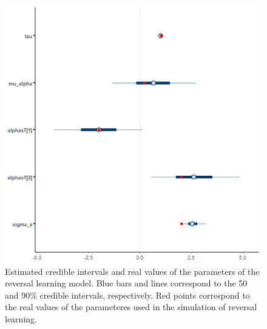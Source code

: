 \documentclass[
]{article}
\begin{document}
\begin{figure}

\includegraphics{reversal_mcmc_interv} \hfill{}

\caption{Estimated credible intervals and real values of the parameters of the reversal learning model. Blue bars and lines correspond to the 50 and 90\% credible intervals, respectively. Red points correspond to the real values of the parameteres used in the simulation of reversal learning. }\label{fig:rev_sim_interv}
\end{figure}
\end{document}
